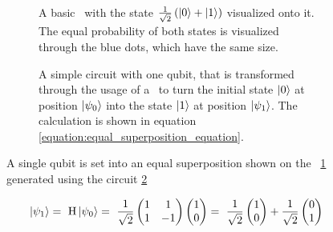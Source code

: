 \begin{figure}[!h]
    \begin{subfigure}{.5\textwidth}
        \centering
        \scalebox{\blochwidth}{
            
        }
        \caption{A basic \qsphere\ with the state $\frac{1}{\sqrt{2}}\left(\ket{0} + \ket{1}\right)$ visualized onto it. The equal probability of both states is visualized through the blue dots, which have the same size.}
        \label{figure:state_h_q_sphere}
    \end{subfigure}
    \begin{subfigure}{.5\textwidth}
        \centering{}
        \caption{A simple circuit with one qubit, that is transformed
    through the usage of a \hgate\ to turn the initial state $\ket{0}$ at position $\ket{\psi_0}$ into the state $\ket{1}$ at position $\ket{\psi_1}$. The calculation is shown in equation \ref{equation:equal_superposition_equation}.}
        \label{figure:h_circuit}
    \end{subfigure}
    \caption{A single qubit is set into an equal superposition shown on the \qsphere\ \ref{figure:state_h_q_sphere} generated using the circuit \ref{figure:h_circuit}}
    \label{figure:_one_qubit_h_state_circuit_qsphere}
\end{figure}



\begin{equation}
    \centering
    \begin{split}
        \ket{\psi_1} =\ \mathrm{H}\ket{\psi_0} =\ \frac{1}{\sqrt{2}}\begin{pmatrix} 1 & 1 \\ 1 & -1 \end{pmatrix}\begin{pmatrix}1 \\ 0\end{pmatrix} =\ \frac{1}{\sqrt{2}}\begin{pmatrix}1 \\ 0 \end{pmatrix} + \frac{1}{\sqrt{2}}\begin{pmatrix}0 \\ 1 \end{pmatrix}\\
    \end{split}
    \label{equation:equal_superposition_equation}
\end{equation}


